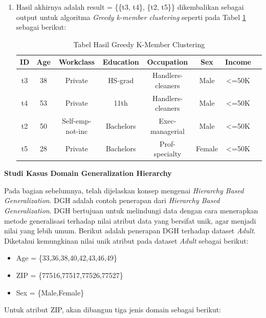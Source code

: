 \documentclass[a4paper,twoside]{article}
\begin{document}
\begin{enumerate}
\begin{enumerate}
\item Hasil akhirnya adalah result = \{\{t3, t4\}, \{t2, t5\}\} dikembalikan sebagai output untuk algoritma \textit{Greedy k-member clustering} seperti pada Tabel \ref{table:greedykmember} sebagai berikut:
\begin{table}[H]
\centering
\caption{Tabel Hasil Greedy K-Member Clustering}
\begin{tabular}{c c c c c c c c}
\hline 
ID & Age & Workclass & Education & Occupation & Sex & Income\\ 
\hline 
t3 & 38 & Private & HS-grad & Handlers-cleaners & Male & <=50K  \\ 
t4 & 53 & Private & 11th & Handlers-cleaners & Male & <=50K  \\ 
\hline 
t2 & 50 & Self-emp-not-inc & Bachelors & Exec-managerial & Male & <=50K  \\ 
t5 & 28 & Private & Bachelors & Prof-specialty & Female & <=50K	 \\ 
\hline 
\end{tabular} 
\label{table:greedykmember}
\end{table}

\end{enumerate}

\textbf{Studi Kasus Domain Generalization Hierarchy}

Pada bagian sebelumnya, telah dijelaskan konsep mengenai \textit{Hierarchy Based Generalization}. DGH adalah contoh penerapan dari \textit{Hierarchy Based Generalization}. DGH bertujuan untuk melindungi data dengan cara menerapkan metode generalisasi terhadap nilai atribut data yang bersifat unik, agar menjadi nilai yang lebih umum. Berikut adalah penerapan DGH terhadap dataset \textit{Adult}. \\

\noindent Diketahui kemungkinan nilai unik atribut pada dataset \textit{Adult} sebagai berikut:

\begin{itemize}
\item Age = \{33,36,38,40,42,43,46,49\}
\item ZIP = \{77516,77517,77526,77527\}
\item Sex = \{Male,Female\}
\end{itemize}

\noindent Untuk atribut ZIP, akan dibangun tiga jenis domain sebagai berikut:


\end{enumerate}
\end{document}
